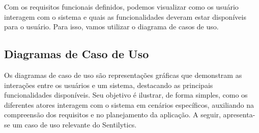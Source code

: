 \documentclass[
	12pt,				%
	oneside,			%
	a4paper,			%
	english,			%
	french,				%
	spanish,			%
	brazil				%
	]{abntex2}
\begin{document}
Com os requisitos funcionais definidos, podemos visualizar como os
usuário interagem com o sistema e quais as funcionalidades deveram estar
disponíveis para o usuário. Para isso, vamos utilizar o diagrama de
casos de uso.

\hypertarget{diagramas-de-caso-de-uso}{%
\subsection{Diagramas de Caso de Uso}\label{diagramas-de-caso-de-uso}}

Os diagramas de caso de uso são representações gráficas que demonstram
as interações entre os usuários e um sistema, destacando as principais
funcionalidades disponíveis. Seu objetivo é ilustrar, de forma simples,
como os diferentes atores interagem com o sistema em cenários
específicos, auxiliando na compreensão dos requisitos e no planejamento
da aplicação. A seguir, apresenta-se um caso de uso relevante do
Sentilytics.
\end{document}
